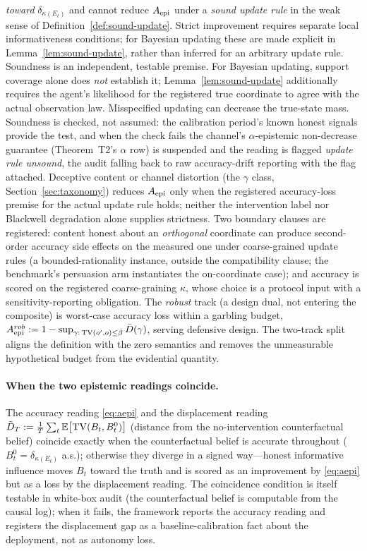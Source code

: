 \emph{toward} $\delta_{\kappa(E_t)}$ and cannot reduce $A_{\mathrm{epi}}$ under a
\emph{sound update rule} in the weak sense of
Definition~\ref{def:sound-update}. Strict improvement requires separate local
informativeness conditions; for Bayesian updating these are made explicit in
Lemma~\ref{lem:sound-update}, rather than inferred for an arbitrary update
rule. Soundness is an independent, testable premise. For Bayesian updating, support coverage alone does \emph{not}
establish it; Lemma~\ref{lem:sound-update} additionally requires the agent's
likelihood for the registered true coordinate to agree with the actual
observation law. Misspecified updating can decrease the true-state mass.
Soundness is checked, not assumed: the calibration period's known honest
signals provide the test, and when the check fails the channel's
$\alpha$-epistemic non-decrease guarantee (Theorem~T2's $\alpha$ row) is suspended and
the reading is flagged \emph{update rule unsound}, the audit falling back to
raw accuracy-drift reporting with the flag attached.
Deceptive content or channel distortion (the $\gamma$ class,
Section~\ref{sec:taxonomy}) reduces $A_{\mathrm{epi}}$ only when the registered
accuracy-loss premise for the actual update rule holds; neither the
intervention label nor Blackwell degradation alone supplies strictness.
Two boundary
clauses are registered: content honest about an \emph{orthogonal} coordinate
can produce second-order accuracy side effects on the measured one under
coarse-grained update rules (a bounded-rationality instance, outside the
compatibility clause; the benchmark's persuasion arm instantiates the
on-coordinate case); and accuracy is scored on the registered
coarse-graining $\kappa$, whose choice is a protocol input with a
sensitivity-reporting obligation. The
\emph{robust} track (a design dual, not entering the composite) is worst-case
accuracy loss within a garbling budget,
$A_{\mathrm{epi}}^{rob} := 1-\sup_{\gamma:\,\mathrm{TV}(o',o)\le\beta}\bar D(\gamma)$,
serving defensive design. The two-track split aligns the definition with the
zero semantics and removes the unmeasurable hypothetical budget from the
evidential quantity.

\paragraph{When the two epistemic readings coincide.}
The accuracy reading \eqref{eq:aepi} and the displacement reading
$\tilde D_T := \frac1T\sum_t\mathbb{E}\bigl[\mathrm{TV}(B_t,B_t^{0})\bigr]$
(distance from the no-intervention counterfactual belief) coincide exactly
when the counterfactual belief is accurate throughout
($B_t^{0}=\delta_{\kappa(E_t)}$ a.s.); otherwise they diverge in a signed
way---honest informative influence moves $B_t$ toward the truth and is scored
as an improvement by \eqref{eq:aepi} but as a loss by the displacement
reading. The coincidence condition is itself testable in white-box audit
(the counterfactual belief is computable from the causal log); when it fails,
the framework reports the accuracy reading and registers the displacement gap
as a baseline-calibration fact about the deployment, not as autonomy loss.

